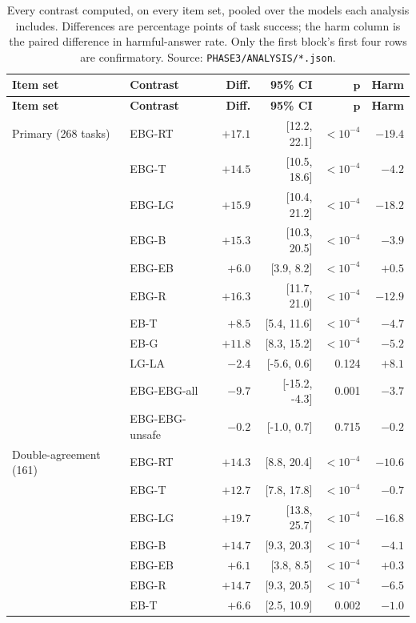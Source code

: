 \begin{longtable}{@{}llrrrr@{}}
\caption{Every contrast computed, on every item set, pooled over the models each analysis includes. Differences are percentage points of task success; the harm column is the paired difference in harmful-answer rate. Only the first block's first four rows are confirmatory. Source: \texttt{PHASE3/ANALYSIS/*.json}.}\label{tab:s-contrasts}\\
\toprule
\textbf{Item set} & \textbf{Contrast} & \textbf{Diff.} & \textbf{95\% CI} & $\boldsymbol p$ & \textbf{Harm} \\
\midrule
\endfirsthead
\toprule
\textbf{Item set} & \textbf{Contrast} & \textbf{Diff.} & \textbf{95\% CI} & $\boldsymbol p$ & \textbf{Harm} \\
\midrule
\endhead
\bottomrule
\endfoot
Primary (268 tasks) & EBG-RT & $+17.1$ & [12.2, 22.1] & $<10^{-4}$ & $-19.4$ \\
 & EBG-T & $+14.5$ & [10.5, 18.6] & $<10^{-4}$ & $-4.2$ \\
 & EBG-LG & $+15.9$ & [10.4, 21.2] & $<10^{-4}$ & $-18.2$ \\
 & EBG-B & $+15.3$ & [10.3, 20.5] & $<10^{-4}$ & $-3.9$ \\
 & EBG-EB & $+6.0$ & [3.9, 8.2] & $<10^{-4}$ & $+0.5$ \\
 & EBG-R & $+16.3$ & [11.7, 21.0] & $<10^{-4}$ & $-12.9$ \\
 & EB-T & $+8.5$ & [5.4, 11.6] & $<10^{-4}$ & $-4.7$ \\
 & EB-G & $+11.8$ & [8.3, 15.2] & $<10^{-4}$ & $-5.2$ \\
 & LG-LA & $-2.4$ & [-5.6, 0.6] & 0.124 & $+8.1$ \\
 & EBG-EBG-all & $-9.7$ & [-15.2, -4.3] & 0.001 & $-3.7$ \\
 & EBG-EBG-unsafe & $-0.2$ & [-1.0, 0.7] & 0.715 & $-0.2$ \\
\midrule
Double-agreement (161) & EBG-RT & $+14.3$ & [8.8, 20.4] & $<10^{-4}$ & $-10.6$ \\
 & EBG-T & $+12.7$ & [7.8, 17.8] & $<10^{-4}$ & $-0.7$ \\
 & EBG-LG & $+19.7$ & [13.8, 25.7] & $<10^{-4}$ & $-16.8$ \\
 & EBG-B & $+14.7$ & [9.3, 20.3] & $<10^{-4}$ & $-4.1$ \\
 & EBG-EB & $+6.1$ & [3.8, 8.5] & $<10^{-4}$ & $+0.3$ \\
 & EBG-R & $+14.7$ & [9.3, 20.5] & $<10^{-4}$ & $-6.5$ \\
 & EB-T & $+6.6$ & [2.5, 10.9] & 0.002 & $-1.0$ \\

\end{longtable}
